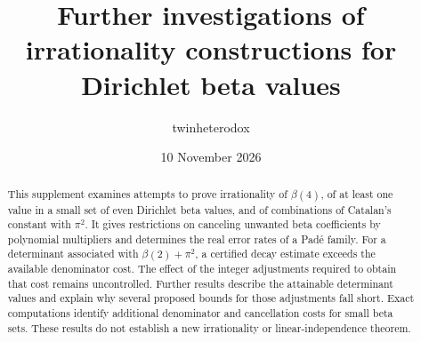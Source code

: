 \documentclass[11pt]{article}
\title{Further investigations of irrationality constructions for Dirichlet beta values}
\author{twinheterodox}
\date{10 November 2026}
\theoremstyle{definition}\newtheorem{definition}[theorem]{Definition}
\theoremstyle{remark}\newtheorem{remark}[theorem]{Remark}
\numberwithin{equation}{section}
\begin{document}
\maketitle
\begin{abstract}
This supplement examines attempts to prove irrationality of $\beta(4)$,
of at least one value in a small set of even Dirichlet beta values,
and of combinations of Catalan's constant with $\pi^2$. It gives
restrictions on canceling unwanted beta coefficients by polynomial
multipliers and determines the real error rates of a Pad\'e family.
For a determinant associated with $\beta(2)+\pi^2$, a certified decay
estimate exceeds the available denominator cost. The effect of the
integer adjustments required to obtain that cost remains uncontrolled.
Further results describe the attainable determinant values and explain
why several proposed bounds for those adjustments fall short. Exact
computations identify additional denominator and cancellation costs
for small beta sets. These results do not establish a new irrationality
or linear-independence theorem.
\end{abstract}
\tableofcontents








\appendix


\end{document}
